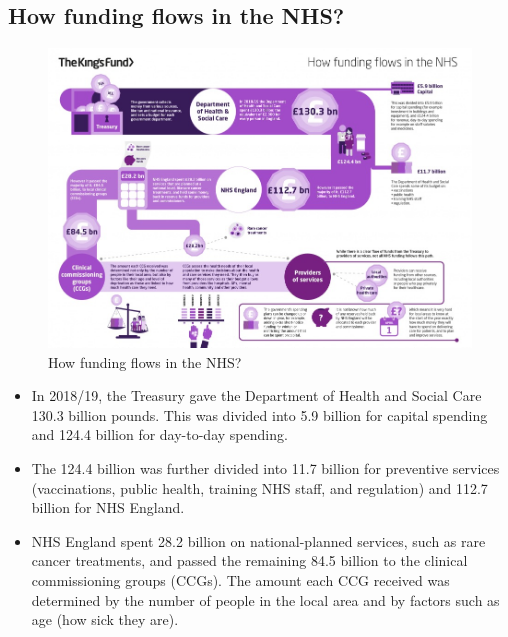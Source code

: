         \subsection{How funding flows in the NHS?} 
        \begin{figure}[H]%
                \centering
                \includegraphics[width=5in]{images/ch3/11.png}
                \caption{How funding flows in the NHS?}
                \label{fig:label}
            \end{figure} 
\begin{itemize}           
        \item In 2018/19, the Treasury gave the Department of Health and Social Care 130.3 billion pounds. This was divided into 5.9 billion for capital spending and 124.4 billion for day-to-day spending. 
        \item The 124.4 billion was further divided into 11.7 billion for preventive services (vaccinations, public health, training NHS staff, and regulation) and 112.7 billion for NHS England. 
        \item NHS England spent 28.2 billion on national-planned services, such as rare cancer treatments, and passed the remaining 84.5 billion to the clinical commissioning groups (CCGs). The amount each CCG received was determined by the number of people in the local area and by factors such as age (how sick they are).
        \end{itemize} 

